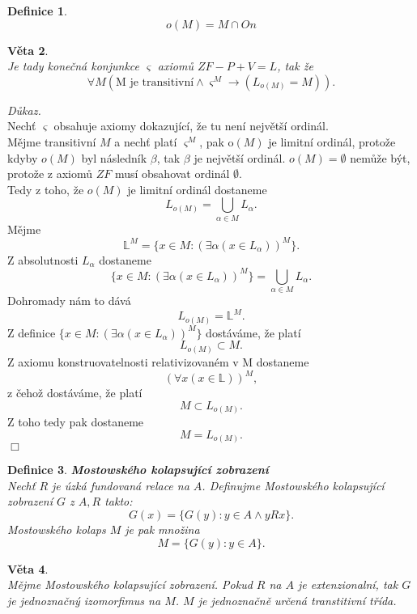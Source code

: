 \documentclass[12pt,a4paper]{article}
\newtheorem{veta}{V\v{e}ta}[section]%
\newtheorem{definice}[veta]{Definice}
\newenvironment{proof}
{\noindent \textit{D\r{u}kaz.}}
{\hspace*{\fill} $\Box$}
\begin{document}
\begin{definice}
\[ o(M)= M  \cap  \textit{On} \]
\end{definice}
\begin{veta}~\\
\label{vet:o(M)}
Je tady kone\v{c}n\'{a} konjunkce $ \varsigma $ axiom\r{u} $ ZF - P + V=L $, tak \v{z}e
\[ \forall M ( \text{M je transitivn\'{i}} \wedge  \varsigma^M \rightarrow (L_{o(M)}= M))  .\]
\end{veta}
\begin{proof}~\\
 Nech\v{t}  $ \varsigma $ obsahuje axiomy dokazuj\'{i}c\'{i}, \v{z}e tu nen\'{i} nejv\v{e}t\v{s}\'{i} ordin\'{a}l.\\
 M\v{e}jme transitivn\'{i} $ M $ a nech\v{t} plat\'{i} $ \varsigma^M $, pak o$ (M) $ je limitn\'{i}  ordin\'{a}l, proto\v{z}e kdyby $ o(M)  $ byl n\'{a}sledn\'{i}k $ \beta $, tak $ \beta $ je nejv\v{e}t\v{s}\'{i} ordin\'{a}l. $o(M)= \emptyset $ nem\r{u}\v{z}e b\'{y}t, proto\v{z}e z axiom\r{u} $ ZF $ mus\'{i} obsahovat ordin\'{a}l $ \emptyset $. \\
 Tedy z toho, \v{z}e $ o(M) $ je limitn\'{i}  ordin\'{a}l dostaneme
\[  L_{o(M)}=\bigcup_{\alpha \in M} L_\alpha .\]
M\v{e}jme 
\[ \mathbb{L}^M = \{x \in M: (\exists \alpha (x \in L_\alpha))^M \} .\]
Z absolutnosti $ L_\alpha $ dostaneme 
\[ \{x \in M: (\exists \alpha (x \in L_\alpha))^M \} = \bigcup_{\alpha \in M} L_\alpha . \]
Dohromady n\'{a}m to d\'{a}v\'{a}
\[  L_{o(M)}=\mathbb{L}^M .\]
Z definice $ \{x \in M: (\exists \alpha (x \in L_\alpha))^M \} $ dost\'{a}v\'{a}me, \v{z}e plat\'{i} 
\[ L_{o(M)} \subset M .\]
Z axiomu konstruovatelnosti relativizovan\'{e}m v M dostaneme \[ (\forall x (x \in \mathbb{L}))^M, \] z \v{c}eho\v{z} dost\'{a}v\'{a}me, \v{z}e plat\'{i} 
\[ M \subset L_{o(M)} \text{.}\]
Z toho tedy pak dostaneme 
\[ M = L_{o(M)} \text{.}\]
\end{proof}
\begin{definice}
\textbf{Mostowsk\'{e}ho kolapsuj\'{i}c\'{i} zobrazen\'{i}}\\
Nech\v{t} $R$ je \'{u}zk\'{a} fundovan\'{a} relace na $A$. Definujme Mostowsk\'{e}ho kolapsuj\'{i}c\'{i} zobrazen\'{i} $G$ z $A,R$ takto:\[ G(x)=\{G(y): y\in A \wedge yRx\}. \]
Mostowsk\'{e}ho kolaps $M$ je pak mno\v{z}ina
\[ M=\{G(y): y\in A\}.
 \]
\end{definice}
\begin{veta}
~\\
M\v{e}jme Mostowsk\'{e}ho kolapsuj\'{i}c\'{i} zobrazen\'{i}. Pokud $  R $ na $A$ je extenzionaln\'{i}, tak $G$ je jednozna\v{c}n\'{y} izomorfimus na $M$. $M$ je jednozna\v{c}n\v{e} ur\v{c}en\'{a} transtitivn\'{i} t\v{r}\'{i}da.
\label{vet:Most}
\end{veta}
\end{document}

